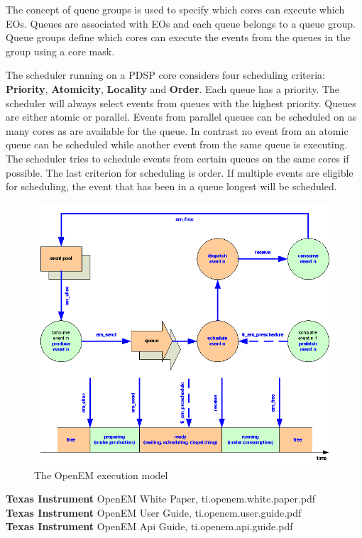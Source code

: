 The concept of queue groups is used to specify which cores can execute which EOs. Queues are associated with EOs and each queue belongs to a queue group. Queue groups define which cores can execute the events from the queues in the group using a core mask.

The scheduler running on a PDSP core considers four scheduling criteria: \textbf{Priority}, \textbf{Atomicity}, \textbf{Locality} and \textbf{Order}. Each queue has a priority. The scheduler will always select events from queues with the highest priority. Queues are either atomic or parallel. Events from parallel queues can be scheduled on as many cores as are available for the queue. In contrast no event from an atomic queue can be scheduled while another event from the same queue is executing. The scheduler tries to schedule events from certain queues on the same cores if possible. The last criterion for scheduling is order. If multiple events are eligible for scheduling, the event that has been in a queue longest will be scheduled.

\begin{figure}[h!]
\begin{center}
\includegraphics[width=1.3\textwidth,natwidth=701,natheight=500]{openem_model.png}
\caption{The OpenEM execution model}\label{tiem}
\end{center}
\end{figure}

\textbf{Texas Instrument} OpenEM White Paper, ti.openem.white.paper.pdf\\
\textbf{Texas Instrument} OpenEM User Guide, ti.openem.user.guide.pdf\\
\textbf{Texas Instrument} OpenEM Api Guide, ti.openem.api.guide.pdf\\



